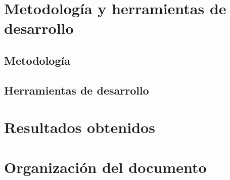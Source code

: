 \section{Metodolog\'ia y herramientas de desarrollo}
\subsection{Metodolog\'ia}



\subsection{Herramientas de desarrollo}


\section{Resultados obtenidos}


\section{Organizaci\'on del documento}


